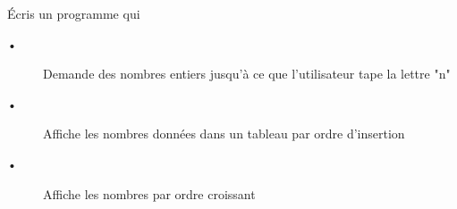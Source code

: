 
Écris un programme qui
\begin{description}
\item[•] Demande des nombres entiers jusqu'à ce que l'utilisateur tape la lettre "n"
\item[•] Affiche les nombres données dans un tableau par ordre d'insertion
\item[•] Affiche les nombres par ordre croissant
\end{description}
